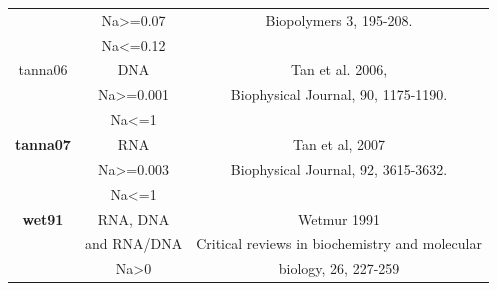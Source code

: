 \documentclass{article}
\begin{document}
\begin{table}[hc]
\begin{tabular}[h]{| c | c | c |}
 & Na>=0.07 & Biopolymers 3, 195-208. \\
 & Na<=0.12 & \\
 \hline
tanna06 & DNA & Tan et al. 2006,  \\
 & Na>=0.001 & Biophysical Journal, 90, 1175-1190. \\
 & Na<=1 & \\
 \hline
\textbf{tanna07} & RNA & Tan et al, 2007 \\
 & Na>=0.003 & Biophysical Journal, 92, 3615-3632. \\
 & Na<=1 & \\
 \hline
\textbf{wet91} & RNA, DNA & Wetmur 1991 \\
 & and RNA/DNA & Critical reviews in biochemistry and molecular \\
 & Na>0 & biology, 26, 227-259 \\
  \hline
\end{tabular}
\end{table}

\clearpage
\end{document}

